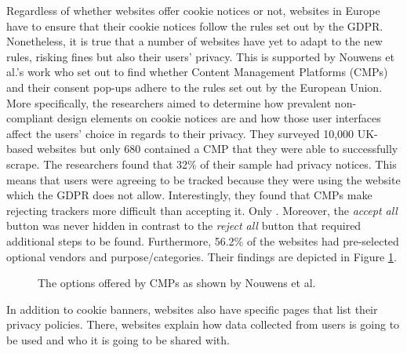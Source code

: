 \documentclass[../main.tex]{subfiles}
\begin{document}
Regardless of whether websites offer cookie notices or not, websites in Europe have to ensure that their cookie notices follow the rules set out by the GDPR. Nonetheless, it is true that a number of websites have yet to adapt to the new rules, risking fines but also their users’ privacy. This is supported by Nouwens et al.'s work \cite{nouwens2020dark} who set out to find whether Content Management Platforms (CMPs) and their consent pop-ups adhere to the rules set out by the European Union. More specifically, the researchers aimed to determine how prevalent non-compliant design elements on cookie notices are and how those user interfaces affect the users’ choice in regards to their privacy. They surveyed 10,000 UK-based websites but only 680 contained a CMP that they were able to successfully scrape. The researchers found that 32\% of their sample had  privacy notices. This means that users were agreeing to be tracked because they were using the website which the GDPR does not allow. Interestingly, they found that CMPs make rejecting trackers more difficult than accepting it. Only . Moreover, the \textit{accept all} button was never hidden in contrast to the \textit{reject all} button that required additional steps to be found. Furthermore, 56.2\% of the websites had pre-selected optional vendors and purpose/categories. Their findings are depicted in Figure \ref{fig:nouwens}.

\begin{figure}[ht]
    \centering
    \caption{The options offered by CMPs as shown by Nouwens et al.}
    \label{fig:nouwens}
\end{figure}

In addition to cookie banners, websites also have specific pages that list their privacy policies. There, websites explain how data collected from users is going to be used and who it is going to be shared with. 
\end{document}
